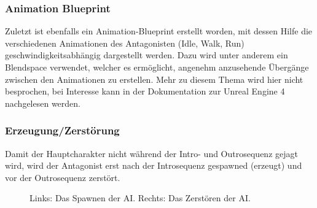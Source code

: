 \subsubsection{Animation Blueprint}
Zuletzt ist ebenfalls ein Animation-Blueprint erstellt worden, mit dessen Hilfe die verschiedenen Animationen des Antagonisten (Idle, Walk, Run) geschwindigkeitsabhängig dargestellt werden. Dazu wird unter anderem ein Blendspace verwendet, welcher es ermöglicht, angenehm anzusehende Übergänge zwischen den Animationen zu erstellen. Mehr zu diesem Thema wird hier nicht besprochen, bei Interesse kann in der Dokumentation zur Unreal Engine 4 nachgelesen werden.
\subsubsection{Erzeugung/Zerstörung}
Damit der Hauptcharakter nicht während der Intro- und Outrosequenz gejagt wird, wird der Antagonist erst nach der Introsequenz gespawned (erzeugt) und vor der Outrosequenz zerstört.
\begin{figure}[H]
    \caption{Links: Das Spawnen der AI. Rechts: Das Zerstören der AI.}
    \label{UE:AI_Spawn_Kill}
\end{figure}

